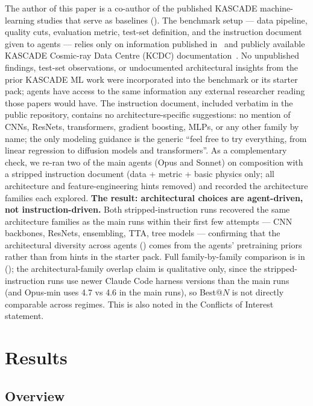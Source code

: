 \documentclass[universe,article,submit,pdftex,oneauthor]{Definitions/mdpi}
\begin{document}
The author of this paper is a co-author of the published KASCADE machine-learning studies that serve as baselines (). The benchmark setup --- data pipeline, quality cuts, evaluation metric, test-set definition, and the instruction document given to agents --- relies only on information published in~\cite{kascade_icrc,kascade_jinst,kascade_jcap} and publicly available KASCADE Cosmic-ray Data Centre (KCDC) documentation~\cite{kcdc_sim_manual}. No unpublished findings, test-set observations, or undocumented architectural insights from the prior KASCADE ML work were incorporated into the benchmark or its starter pack; agents have access to the same information any external researcher reading those papers would have. The instruction document, included verbatim in the public repository, contains no architecture-specific suggestions: no mention of CNNs, ResNets, transformers, gradient boosting, MLPs, or any other family by name; the only modeling guidance is the generic ``feel free to try everything, from linear regression to diffusion models and transformers''. As a complementary check, we re-ran two of the main agents (Opus and Sonnet) on composition with a stripped instruction document (data + metric + basic physics only; all architecture and feature-engineering hints removed) and recorded the architecture families each explored. \textbf{The result: architectural choices are agent-driven, not instruction-driven.} Both stripped-instruction runs recovered the same architecture families as the main runs within their first few attempts --- CNN backbones, ResNets, ensembling, TTA, tree models --- confirming that the architectural diversity across agents () comes from the agents' pretraining priors rather than from hints in the starter pack. Full family-by-family comparison is in  (); the architectural-family overlap claim is qualitative only, since the stripped-instruction runs use newer Claude Code harness versions than the main runs (and Opus-min uses 4.7 vs 4.6 in the main runs), so Best@$N$ is not directly comparable across regimes. This is also noted in the Conflicts of Interest statement.


\section{Results}
\label{sec:results}

\subsection{Overview}
\end{document}
